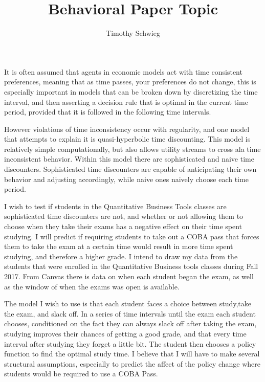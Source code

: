\documentclass[10pt]{paper}
\title{Behavioral Paper Topic}
\author{Timothy Schwieg}
\begin{document}
{ 
It is often assumed that agents in economic models act with time
consistent preferences, meaning that as time passes, your preferences
do not change, this is especially important in models that can be broken
down by discretizing the time interval, and then asserting a decision
rule that is optimal in the current time period, provided that it is
followed in the following time intervals.

However violations of time inconsistency occur with regularity, and
one model that attempts to explain it is quasi-hyperbolic time
discounting. This model is relatively simple computationally, but also
allows utility streams to cross ala time inconsistent behavior. Within this
model there are sophisticated and naive time
discounters. Sophisticated time discounters are capable of
anticipating their own behavior and adjusting accordingly, while naive
ones naively choose each time period.

I wish to test if students in the Quantitative Business Tools classes
are sophisticated time discounters are not, and whether or not
allowing them to choose when they take their exams has a negative
effect on their time spent studying. I will predict if requiring
students to take out a COBA pass that forces them to take the exam at
a certain time would result in more time spent studying, and therefore
a higher grade. I intend to draw my data from the students that were enrolled in the
Quantitative Business tools classes during Fall 2017. From Canvas
there is data on when each student began the exam, as well as the window of
when the exams was open is available.

The model I wish to use is that each student faces a choice between
study,take the exam, and slack off. In a series of time intervals
until the exam each student chooses, conditioned on the fact they can always slack off after taking the exam,
studying improves their chances of getting a good grade, and that
every time interval after studying they forget a little bit. The
student then chooses a policy function to find the optimal study
time. I believe that I will have to make several structural
assumptions, especially to predict the affect of the policy change
where students would be required to use a COBA Pass. 


}
\end{document}
